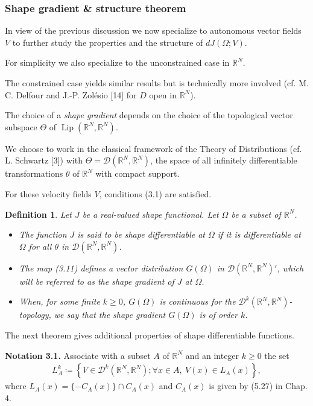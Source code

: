 \documentclass[oneside]{book}
\numberwithin{equation}{section}
\newtheorem{definition}{Definition}[section]
\begin{document}
\subsubsection{Shape gradient \& structure theorem}
In view of the previous discussion we now specialize to autonomous vector fields $V$ to further study the properties and the structure of $dJ(\Omega;V)$.

For simplicity we also specialize to the unconstrained case in $\mathbb{R}^N$.

The constrained case yields similar results but is technically more involved (cf. M. C. Delfour and J.-P. Zolésio [14] for $D$ open in $\mathbb{R}^N$).

%
The choice of a \textit{shape gradient} depends on the choice of the topological vector subspace $\Theta$ of $\operatorname{Lip}(\mathbb{R}^N,\mathbb{R}^N)$.

We choose to work in the classical framework of the Theory of Distributions (cf. L. Schwartz [3]) with $\Theta = \mathcal{D}(\mathbb{R}^N,\mathbb{R}^N)$, the space of all infinitely differentiable transformations $\theta$ of $\mathbb{R}^N$ with compact support.

For these velocity fields $V$, conditions (3.1) are satisfied.

\begin{definition}
    Let $J$ be a real-valued shape functional. Let $\Omega$ be a subset of $\mathbb{R}^N$.
    \begin{itemize}
        \item[(i)] The function $J$ is said to be \emph{shape differentiable} at $\Omega$ if it is differentiable at $\Omega$ for all $\theta$ in $\mathcal{D}(\mathbb{R}^N,\mathbb{R}^N)$.
        \item[(ii)] The map (3.11) defines a vector distribution $G(\Omega)$ in $\mathcal{D}(\mathbb{R}^N,\mathbb{R}^N)'$, which will be referred to as the \emph{shape gradient} of $J$ at $\Omega$.
        \item[(iii)] When, for some finite $k\ge 0$, $G(\Omega)$ is continuous for the $\mathcal{D}^k(\mathbb{R}^N,\mathbb{R}^N)$-topology, we say that the shape gradient $G(\Omega)$ is of order $k$.
    \end{itemize}
\end{definition}
The next theorem gives additional properties of shape differentiable functions.

\textbf{Notation 3.1.} Associate with a subset $A$ of $\mathbb{R}^N$ and an integer $k\ge 0$ the set
\begin{align*}
    L_A^k\coloneqq\left\{V\in\mathcal{D}^k(\mathbb{R}^N,\mathbb{R}^N);\forall x\in A,\ V(x)\in L_A(x)\right\},
\end{align*}
where $L_A(x) = \{-C_A(x)\}\cap C_A(x)$ and $C_A(x)$ is given by (5.27) in Chap. 4.
\end{document}
